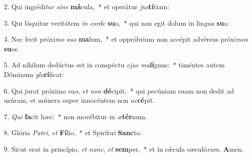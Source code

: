 2. Qui ingrédi\textit{tur} \textit{si}\textit{ne} \textbf{má}cula,~*  et operátur \textit{jus}\textbf{tí}tiam:\

3. Qui lóquitur veritátem \textit{in} \textit{cor}\textit{de} \textbf{su}o,~*  qui non egit dolum in lin\textit{gua} \textbf{su}a:\

4. Nec fecit próxi\textit{mo} \textit{su}\textit{o} \textbf{ma}lum,~*  et oppróbrium non accépit advérsus próxi\textit{mos} \textbf{su}os.\

5. Ad níhilum dedúctus est in conspéctu \textit{e}\textit{jus} \textit{ma}\textbf{lí}gnus:~*  timéntes autem Dóminum \textit{glo}\textbf{rí}ficat:\

6. Qui jurat próximo su\textit{o}, \textit{et} \textit{non} \textbf{dé}cipit,~*  qui pecúniam suam non dedit ad usúram, et múnera super innocéntem non \textit{ac}\textbf{cé}pit.\

7. \textit{Qui} \textbf{fa}cit hæc:~*  non movébitur in \textit{æ}\textbf{tér}num.\

8. Glória \textit{Pa}\textit{tri}, \textit{et} \textbf{Fí}lio,~*  et Spirítu\textit{i} \textbf{Sanc}to.\

9. Sicut erat in princípio, \textit{et} \textit{nunc}, \textit{et} \textbf{sem}per,~*  et in sǽcula sæculó\textit{rum}. \textbf{A}men.\

